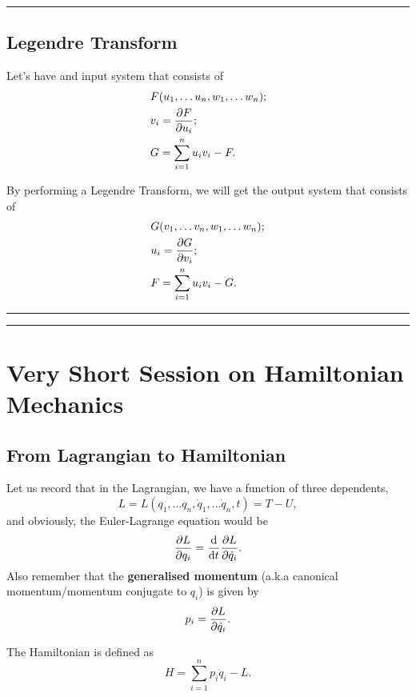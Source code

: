 \documentclass[12pt,english]{article}
\numberwithin{equation}{subsection}
\begin{document}
\par\noindent\rule{\textwidth}{0.4pt}
\subsection{Legendre Transform}
Let's have and input system that consists of 
\begin{align*}
    &F(u_1, \dots u_n, w_1, \dots w_n);\\
    &v_i = \pdv{F}{u_i};\\
    &G = \sum_{i = 1}^{n} u_i v_i - F.
\end{align*}

By performing a Legendre Transform, we will get the output system that consists of 
\begin{align*}
    &G(v_1, \dots v_n, w_1, \dots w_n);\\
    &u_i = \pdv{G}{v_i};\\
    &F = \sum_{i = 1}^{n} u_i v_i - G.
\end{align*}
\par\noindent\rule{\textwidth}{0.4pt}
\par\noindent\rule{\textwidth}{0.4pt}


\section{Very Short Session on Hamiltonian Mechanics}
\subsection{From Lagrangian to Hamiltonian}
Let us record that in the Lagrangian, we have a function of three dependents,
\begin{equation}
    L = L(q_1, \dots q_n, \dot{q}_1, \dots \dot{q}_n, t) = T - U,
\end{equation}
and obviously, the Euler-Lagrange equation would be
\begin{equation}
    \pdv{L}{q_i} = \dv{t}\pdv{L}{\dot{q}_i}.
\end{equation}
Also remember that the \textbf{generalised momentum} (a.k.a canonical momentum/momentum conjugate to $q_i$) is given by 
\begin{equation}
    p_i = \pdv{L}{\dot{q}_i}.
\end{equation}

The Hamiltonian is defined as
\begin{equation}
    H = \sum_{i = 1}^{n} p_i \dot{q}_i - L.
\end{equation}
\end{document}
